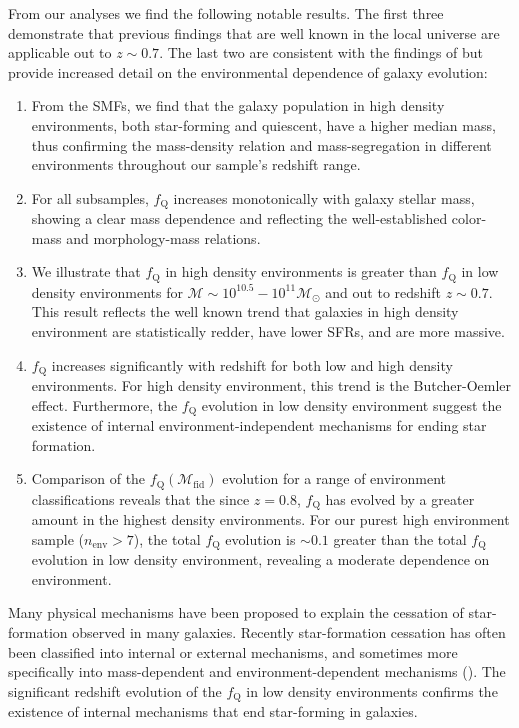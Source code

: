 \documentclass{emulateapj}
\begin{document}
From our analyses we find the following notable results. The first
three demonstrate that previous findings that are well known in the
local universe are applicable out to $z\sim 0.7$. The last two are
consistent with the findings of \cite{Peng:2010aa} but provide increased
detail on the environmental dependence of galaxy evolution:
\begin{enumerate}
	\item From the SMFs, we find that the galaxy population in high
    density environments, both star-forming and quiescent, have a
    higher median mass, thus confirming the mass-density relation and
    mass-segregation in different environments throughout our sample's
    redshift range.
	\item For all subsamples, $f_{\mathrm{Q}}$ increases monotonically with
    galaxy stellar mass, showing a clear mass dependence and
    reflecting the well-established color-mass and morphology-mass
    relations.
	\item We illustrate that $f_{\mathrm{Q}}$ in high density environments
    is greater than $f_{\mathrm{Q}}$ in low density environments
    for $\mathcal{M} \sim 10^{10.5} -10^{11} \mathcal{M}_\odot$ and out to redshift $z\sim 0.7$. This result
    reflects the well known trend that galaxies in high density
    environment are statistically redder, have lower SFRs, and are
    more massive.
	\item $f_{\mathrm{Q}}$ increases significantly with redshift for both
    low and high density environments. For high density environment,
    this trend is the Butcher-Oemler effect. Furthermore, the
    $f_{\mathrm{Q}}$ evolution in low density environment suggest the
    existence of internal environment-independent mechanisms for
    ending star formation.
	\item Comparison of the $f_{\mathrm{Q}}(\mathcal{M}_{\mathrm{fid}})$
    evolution for a range of environment classifications reveals that
    the since $z = 0.8$, $f_{\mathrm{Q}}$ has evolved by a greater amount
    in the highest density environments. For our purest high
    environment sample ($n_{\mathrm{env}} > 7$), the total $f_{\mathrm{Q}}$
    evolution is $\sim 0.1$ greater than the total $f_{\mathrm{Q}}$
    evolution in low density environment, revealing a moderate
    dependence on environment.
\end{enumerate}

Many physical mechanisms have been proposed to explain the cessation
of star-formation observed in many galaxies. Recently star-formation
cessation has often been classified into internal or external
mechanisms, and sometimes more specifically into mass-dependent and
environment-dependent mechanisms (\citealt{Baldry:2006aa,
  Peng:2010aa}). The significant redshift evolution of the
$f_{\mathrm{Q}}$ in low density environments confirms the existence of
internal mechanisms that end star-forming in galaxies.
\end{document}
